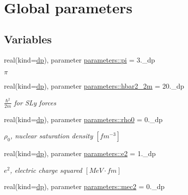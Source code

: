 \hypertarget{group__CONSTANTS}{}\section{Global parameters}
\label{group__CONSTANTS}
\subsection*{Variables}
\begin{DoxyCompactItemize}
\item 
real(kind=\mbox{\hyperlink{namespaceparameters_a52f8c6351fd79345d8811e065bcbbb37}{dp}}), parameter \mbox{\hyperlink{group__CONSTANTS_ga399aac088b57a76a8a5a3784448ba3cf}{parameters\+::pi}} = 3.\+\_\+dp
\begin{DoxyCompactList}\small\item\em $\pi$ \end{DoxyCompactList}\item 
real(kind=\mbox{\hyperlink{namespaceparameters_a52f8c6351fd79345d8811e065bcbbb37}{dp}}), parameter \mbox{\hyperlink{group__CONSTANTS_gad4b06975615fad2c991376a975fd08f1}{parameters\+::hbar2\+\_\+2m}} = 20.\+\_\+dp
\begin{DoxyCompactList}\small\item\em $\frac{\hbar^2}{2m}$ for S\+Ly forces \end{DoxyCompactList}\item 
real(kind=\mbox{\hyperlink{namespaceparameters_a52f8c6351fd79345d8811e065bcbbb37}{dp}}), parameter \mbox{\hyperlink{group__CONSTANTS_ga0796781a51dc993c4b563f7ac404c641}{parameters\+::rho0}} = 0.\+\_\+dp
\begin{DoxyCompactList}\small\item\em $\rho_0$, nuclear saturation density $[fm^{-3}]$ \end{DoxyCompactList}\item 
real(kind=\mbox{\hyperlink{namespaceparameters_a52f8c6351fd79345d8811e065bcbbb37}{dp}}), parameter \mbox{\hyperlink{group__CONSTANTS_gaafa6a6262bc00c89fb3d403241497d22}{parameters\+::e2}} = 1.\+\_\+dp
\begin{DoxyCompactList}\small\item\em $e^2$, electric charge squared $[MeV\cdot fm]$ \end{DoxyCompactList}\item 
real(kind=\mbox{\hyperlink{namespaceparameters_a52f8c6351fd79345d8811e065bcbbb37}{dp}}), parameter \mbox{\hyperlink{group__CONSTANTS_ga8b91e60e1e7c4b066cc282415c740bc9}{parameters\+::mec2}} = 0.\+\_\+dp

\end{DoxyCompactItemize}

